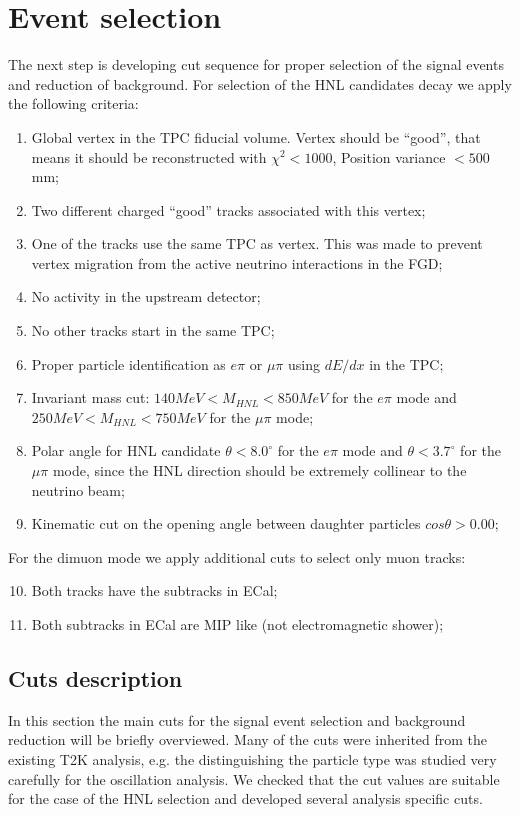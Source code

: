 \documentclass[../main.tex]{subfiles}
\begin{document}
\section{Event selection}
\label{sec:HNL:sel}

The next step is developing cut sequence for proper selection of the signal events and reduction of background. For selection of the HNL candidates decay we apply the following criteria:
\begin{enumerate}
  \item Global vertex in the TPC fiducial volume. Vertex should be ``good'', that means it should be reconstructed with $\chi^2<1000$, Position variance $<500$ mm;
  \item Two different charged ``good'' tracks associated with this vertex;
  \item One of the tracks use the same TPC as vertex. This was made to prevent vertex migration from the active neutrino interactions in the FGD;
  \item No activity in the upstream detector;
  \item No other tracks start in the same TPC;
  \item Proper particle identification as $e\pi$ or $\mu \pi$ using $dE/dx$ in the TPC;
  \item Invariant mass cut: $140MeV<M_{HNL}<850MeV$ for the $e\pi$ mode and $250MeV<M_{HNL}<750MeV$ for the $\mu \pi$ mode;
  \item Polar angle for HNL candidate $\theta < 8.0^\circ$ for the $e\pi$ mode and $\theta < 3.7^\circ$ for the $\mu\pi$ mode, since the HNL direction should be extremely collinear to the neutrino beam;
  \item Kinematic cut on the opening angle between daughter particles $cos\theta >0.00$;
\end{enumerate}

For the dimuon mode we apply additional cuts to select only muon tracks:

\begin{enumerate}
  \setcounter{enumi}{9}
  \item Both tracks have the subtracks in ECal;
  \item Both subtracks in ECal are MIP like (not electromagnetic shower);
\end{enumerate}

\subsection{Cuts description}
In this section the main cuts for the signal event selection and background reduction will be briefly overviewed. Many of the cuts were inherited from the existing T2K analysis, e.g. the distinguishing the particle type was studied very carefully  for the oscillation analysis. We checked that the cut values are suitable for the case of the HNL selection and developed several analysis specific cuts.
\end{document}
